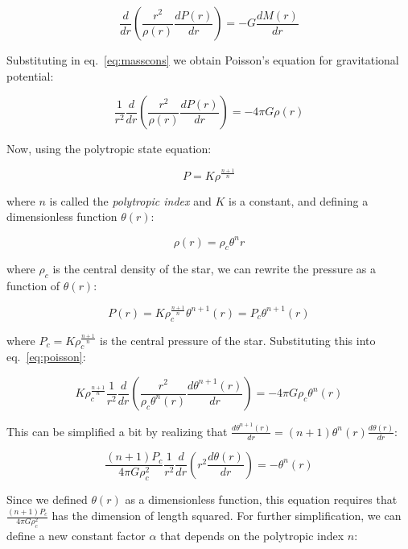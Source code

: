 \documentclass[twoside]{article}
\begin{document}
\[
\frac{d}{dr}\left(\frac{r^2}{\rho(r)}\frac{dP(r)}{dr}\right)=-G\frac{dM(r)}{dr}
\]

Substituting in eq.~\ref{eq:masscons} we obtain Poisson's equation for gravitational potential:

\begin{equation}
    \label{eq:poisson}
    \frac{1}{r^2} \frac{d}{dr} \left( \frac{r^2}{\rho(r)}\frac{dP(r)}{dr} \right) = -4 \pi G\rho(r)
\end{equation}

Now, using the polytropic state equation:

\begin{equation}
    \label{eq:polytropstate}
    P=K\rho^{\frac{n+1}{n}}
\end{equation}

where \(n\) is called the \textit{polytropic index} and \(K\) is a constant, and
defining a dimensionless function \(\theta(r)\):

\begin{equation}
    \label{eq:thetar}
    \rho(r)=\rho_c\theta^n{r}
\end{equation}

where \(\rho_c\) is the central density of the star, we can rewrite the pressure
as a function of \(\theta(r)\):

            \[
                P(r)=K\rho_c^{\frac{n+1}{n}}\theta^{n+1}(r)=P_c\theta^{n+1}(r)
            \]

            where \(P_c=K\rho_c^{\frac{n+1}{n}}\) is the central pressure of the
            star. Substituting this into eq.~\ref{eq:poisson}:

            \[
                K\rho_c^{\frac{n+1}{n}}\frac{1}{r^2}\frac{d}{dr}\left(\frac{r^2}{\rho_c\theta^n(r)}\frac{d\theta^{n+1}(r)}{dr}\right)=-4\pi
                G\rho_c\theta^n(r)
            \]

            This can be simplified a bit by realizing that
            \(\frac{d\theta^{n+1}(r)}{dr}=(n+1)\theta^n(r)\frac{d\theta(r)}{dr}\):

            \begin{equation}
                \label{eq:simplpois}
                \frac{(n+1)P_c}{4\pi
                G\rho_c^2}\frac{1}{r^2}\frac{d}{dr}\left(r^2\frac{d\theta(r)}{dr}\right)=-\theta^n(r)
            \end{equation}

            Since we defined \(\theta(r)\) as a dimensionless function, this
            equation requires that \(\frac{(n+1)P_c}{4\pi G\rho_c^2}\) has the
            dimension of length squared. For further simplification, we can
            define a new constant factor \(\alpha\) that depends on the
            polytropic index \(n\):
\end{document}

